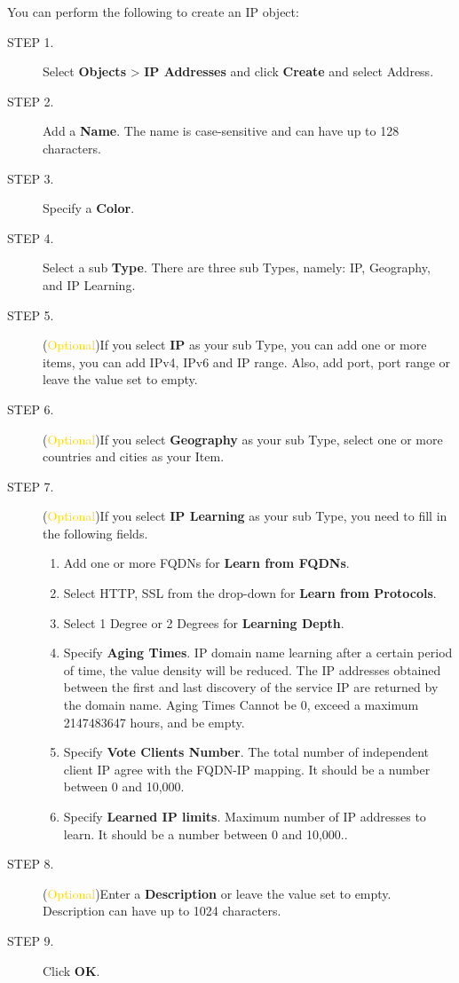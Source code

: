 You can perform the following to create an IP object:

\begin{description}
    \item[STEP 1.]	Select \textbf{Objects} > \textbf{IP Addresses} and click \textbf{Create} and select Address.
    \item[STEP 2.]	Add a \textbf{Name}. The name is case-sensitive and can have up to 128 characters.
    \item[STEP 3.]	Specify a \textbf{Color}.
    \item[STEP 4.]	Select a sub \textbf{Type}. There are three sub Types, namely: IP, Geography, and IP Learning.
    \item[STEP 5.]	(\textcolor{gold}{Optional})If you select \textbf{IP} as your sub Type, you can add one or more items, you can add IPv4, IPv6 and IP range. Also, add port, port range or leave the value set to empty.
    \item[STEP 6.]	(\textcolor{gold}{Optional})If you select \textbf{Geography} as your sub Type, select one or more countries and cities as your Item. 
    \item[STEP 7.]	(\textcolor{gold}{Optional})If you select \textbf{IP Learning} as your sub Type, you need to fill in the following fields.
    \begin{enumerate}  
        \item Add one or more FQDNs for \textbf{Learn from FQDNs}.
        \item Select HTTP, SSL from the drop-down for \textbf{Learn from Protocols}.
        \item Select 1 Degree or 2 Degrees for \textbf{Learning Depth}.
        \item Specify \textbf{Aging Times}. IP domain name learning after a certain period of time, the value density will be reduced. 
        The IP addresses obtained between the first and last discovery of the service IP are returned by the domain name. 
        Aging Times Cannot be 0, exceed a maximum 2147483647 hours, and be empty.
        \item Specify \textbf{Vote Clients Number}. The total number of independent client IP agree with the FQDN-IP mapping. It should be a number between 0 and 10,000.
        \item Specify \textbf{Learned IP limits}. Maximum number of IP addresses to learn. It should be a number between 0 and 10,000..
    \end{enumerate}    
    \item[STEP 8.]	(\textcolor{gold}{Optional})Enter a \textbf{Description} or leave the value set to empty. Description can have up to 1024 characters.
    \item[STEP 9.]	Click \textbf{OK}.
\end{description}

